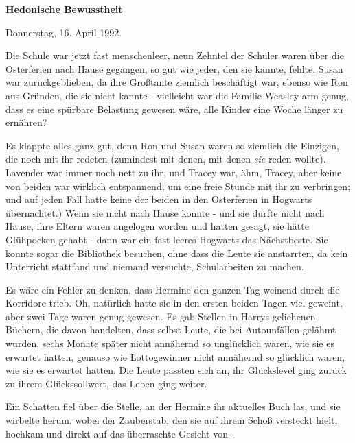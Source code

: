 

\hypertarget{hedonische-bewusstheit}{%

\textbf{\uline{Hedonische Bewusstheit}}

Donnerstag, 16. April 1992.

Die Schule war jetzt fast menschenleer, neun Zehntel der Schüler waren über die Osterferien nach Hause gegangen, so gut wie jeder, den sie kannte, fehlte. Susan war zurückgeblieben, da ihre Großtante ziemlich beschäftigt war, ebenso wie Ron aus Gründen, die sie nicht kannte - vielleicht war die Familie Weasley arm genug, dass es eine spürbare Belastung gewesen wäre, alle Kinder eine Woche länger zu ernähren?

Es klappte alles ganz gut, denn Ron und Susan waren so ziemlich die Einzigen, die noch mit ihr redeten (zumindest mit denen, mit denen \emph{sie} reden wollte). Lavender war immer noch nett zu ihr, und Tracey war, ähm, Tracey, aber keine von beiden war wirklich entspannend, um eine freie Stunde mit ihr zu verbringen; und auf jeden Fall hatte keine der beiden in den Osterferien in Hogwarts übernachtet.) Wenn sie nicht nach Hause konnte - und sie durfte nicht nach Hause, ihre Eltern waren angelogen worden und hatten gesagt, sie hätte Glühpocken gehabt - dann war ein fast leeres Hogwarts das Nächstbeste. Sie konnte sogar die Bibliothek besuchen, ohne dass die Leute sie anstarrten, da kein Unterricht stattfand und niemand versuchte, Schularbeiten zu machen.

Es wäre ein Fehler zu denken, dass Hermine den ganzen Tag weinend durch die Korridore trieb. Oh, natürlich hatte sie in den ersten beiden Tagen viel geweint, aber zwei Tage waren genug gewesen. Es gab Stellen in Harrys geliehenen Büchern, die davon handelten, dass selbst Leute, die bei Autounfällen gelähmt wurden, sechs Monate später nicht annähernd so unglücklich waren, wie sie es erwartet hatten, genauso wie Lottogewinner nicht annähernd so glücklich waren, wie sie es erwartet hatten. Die Leute passten sich an, ihr Glückslevel ging zurück zu ihrem Glückssollwert, das Leben ging weiter.

Ein Schatten fiel über die Stelle, an der Hermine ihr aktuelles Buch las, und sie wirbelte herum, wobei der Zauberstab, den sie auf ihrem Schoß versteckt hielt, hochkam und direkt auf das überraschte Gesicht von -

}
